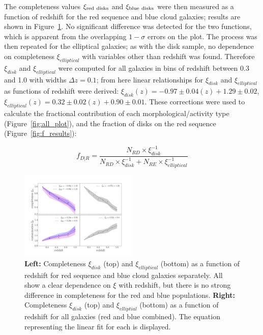 \documentclass[useAMS,usenatbib]{mn2e}
\begin{document}
The completeness values $\rm \xi_{red~disks}$ and $\rm \xi_{blue~disks}$ were then measured as a function of redshift for the red sequence and blue cloud  galaxies; results are shown in Figure~\ref{fig:xi}. No significant difference was detected for the two functions, which is apparent from the overlapping $1-\sigma$ errors on the plot. The process was then repeated for the elliptical galaxies; as with the disk sample, no dependence on completeness $\xi_{elliptical}$ with variables other than redshift was found. Therefore $\xi_{disk}$ and $\xi_{elliptical}$ were computed for all galaxies in bins of redshift between 0.3 and 1.0 with widths $\Delta z = 0.1$; from here linear relationships for $\xi_{disk}$ and $\xi_{elliptical}$ as functions of redshift were derived: $\xi_{disk}(z) = -0.97 \pm 0.04 (z) + 1.29 \pm 0.02$, $\xi_{elliptical}(z) = 0.32 \pm 0.02 (z) + 0.90 \pm 0.01$. These corrections were used to calculate the fractional contribution of each morphological/activity type (Figure~\ref{fig:all_plot}), and the fraction of disks on the red sequence (Figure~\ref{fig:f_results}):

\begin{equation}
f_{D|R}=\frac{N_{RD}\times \xi_{disk}^{-1}}{N_{RD}\times \xi_{disk}^{-1} + N_{RE}\times \xi_{elliptical}^{-1}}
\label{eqn:frid}
\end{equation}


\begin{figure}
\centering
\includegraphics[width=0.5\textwidth,trim={3cm 2cm 3cm 3cm},clip]{figures/completeness_full.pdf}
\caption{\textbf{Left:} Completeness $\xi_{disk}$ (top) and $\xi_{elliptical}$ (bottom) as a function of redshift for red sequence and blue cloud  galaxies separately. All show a clear dependence on $\xi$ with redshift, but there is no strong difference in completeness for the red and blue populations. \textbf{Right:} Completeness $\xi_{disk}$ (top) and $\xi_{elliptial}$ (bottom) as a function of redshift for all   galaxies (red and blue combined). The equation representing the linear fit for each is displayed.}
\label{fig:xi}
\end{figure}
\end{document}
